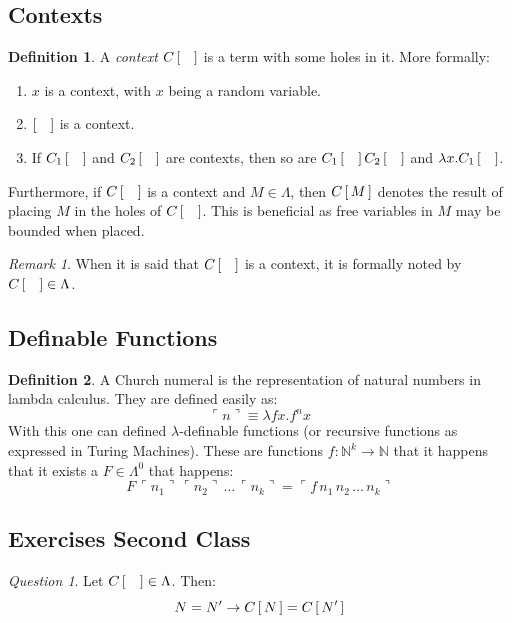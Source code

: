\documentclass[11pt]{article}
\theoremstyle{definition}
\newtheorem{definition}{Definition}[section]
\theoremstyle{remark}
\newtheorem{remark}{Remark}
\theoremstyle{remark}
\newtheorem{question}{Question}
\theoremstyle{definition}
\newcommand{\N}{\mathbb{N}}
\newcommand{\ch}[1]{\ulcorner #1 \urcorner}
\begin{document}
\subsection{Contexts}
\begin{definition}
  A \textit{context} $C\cx$ is a term with some holes in it. More formally:
  \begin{enumerate}
    \item $x$ is a context, with $x$ being a random variable.
    \item $\cx$ is a context.
    \item If $C_1\cx$ and $C_2\cx$ are contexts, then so are $C_1\cx C_2\cx$ and
          $\lambda x. C_1\cx$.
  \end{enumerate}
  Furthermore, if $C\cx$ is a context and $M \in \Lambda$, then $C\cx[M]$
  denotes the result of placing $M$ in the holes of $C\cx$. This is beneficial
  as free variables in $M$ may be bounded when placed.
\end{definition}

\begin{remark}
  When it is said that $C\cx$ is a context, it is formally noted by
  $C\cx \in \Lambda$.
\end{remark}

\subsection{Definable Functions}
\begin{definition}
  A Church numeral is the representation of natural numbers in lambda calculus.
  They are defined easily as:
  \begin{equation*}
    \ch{n} \equiv \lambda fx. f^nx
  \end{equation*}
  With this one can defined $\lambda$-definable functions (or recursive
  functions as expressed in Turing Machines). These are functions
  $f: \N^k \rightarrow \N$ that it happens that it exists a $F \in \Lambda^0$
  that happens:
  \begin{equation*}
    F \, \ch{n_1} \, \ch{n_2} \, \dots \, \ch{n_k} = \ch{f\, n_1\, n_2\, \dots \,n_k}
  \end{equation*}
\end{definition}

\subsection{Exercises Second Class}
\begin{question}
  Let $C\cx \in \Lambda$. Then:
  \begin{equation*}
    N = N' \rightarrow C\cx[N] = C\cx[N']
  \end{equation*}
\end{question}
\end{document}
